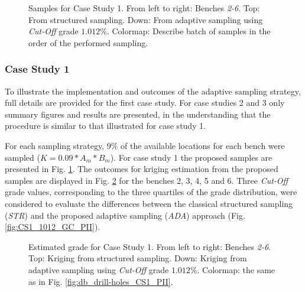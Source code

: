 \begin{figure}
	\centering
	\caption{\label{fig:CS1_1012_GS_PII} Samples for Case Study 1. From left to right: Benches \emph{2-6}. Top: From structured sampling. Down: From adaptive sampling using \emph{Cut-Off} grade $1.012\%$. Colormap: Describe batch of samples in the order of the performed sampling.}
\end{figure}

















\subsubsection*{Case Study 1}

To illustrate the implementation and outcomes of the adaptive sampling strategy, full details are provided for the first case study. For case studies 2 and 3 only summary figures and results are presented, in the understanding that the procedure is similar to that illustrated for case study 1.

For each sampling strategy, $9\%$ of the available locations for each bench were sampled ($K = 0.09 * A_m * B_m$). For case study 1 the proposed samples are presented in Fig. \ref{fig:CS1_1012_GS_PII}. The outcomes for kriging estimation from the proposed samples are displayed in Fig. \ref{fig:CS1_1012_EG_PII} for the benches 2, 3, 4, 5 and 6. Three \emph{Cut-Off} grade values, corresponding to the three quartiles of the grade distribution, were considered to evaluate the differences between the classical structured sampling (\emph{STR}) and the proposed adaptive sampling (\emph{ADA}) approach (Fig. \ref{fig:CS1_1012_GC_PII}).


\begin{figure}
	\centering
	\caption{\label{fig:CS1_1012_EG_PII} Estimated grade for Case Study 1. From left to right: Benches \emph{2-6}. Top: Kriging from structured sampling. Down: Kriging from adaptive sampling using \emph{Cut-Off} grade $1.012\%$. Colormap: the same as in Fig. \ref{fig:db_drill-holes_CS1_PII}.}
\end{figure}

